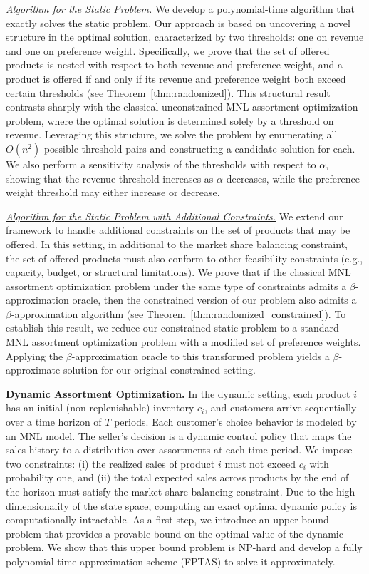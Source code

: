 \documentclass[mnsc,non-blindrev]{informs3}
\theoremstyle{definition}
\begin{document}
\noindent\underline{\it Algorithm for the Static Problem.} We develop a polynomial-time algorithm that exactly solves the static problem. Our approach is based on uncovering a novel structure in the optimal solution, characterized by two thresholds: one on revenue and one on preference weight. Specifically, we prove that the set of offered products is nested with respect to both revenue and preference weight, and a product is offered if and only if its revenue and preference weight both exceed certain thresholds (see Theorem~\ref{thm:randomized}). This structural result contrasts sharply with the classical unconstrained MNL assortment optimization problem, where the optimal solution is determined solely by a threshold on revenue.
Leveraging this structure, we solve the problem by enumerating all $O(n^2)$ possible threshold pairs and constructing a candidate solution for each. We also perform a sensitivity analysis of the thresholds with respect to $\alpha$, showing that the revenue threshold increases as $\alpha$ decreases, while the preference weight threshold may either increase or decrease.


\noindent\underline{\it Algorithm for the Static Problem with Additional Constraints.} We extend our framework to handle additional constraints on the set of products that may be offered. In this setting, in additional to the market share balancing constraint, the set of offered products must also conform to other feasibility constraints (e.g., capacity, budget, or structural limitations). We prove that if the classical MNL assortment optimization problem under the same type of constraints admits a $\beta$-approximation oracle, then the constrained version of our problem also admits a $\beta$-approximation algorithm (see Theorem~\ref{thm:randomized_constrained}).
To establish this result, we reduce our constrained static problem to a standard MNL assortment optimization problem with a modified set of preference weights. Applying the $\beta$-approximation oracle to this transformed problem yields a $\beta$-approximate solution for our original constrained setting.

\vspace{2mm}
\noindent\textbf{Dynamic Assortment Optimization.} In the dynamic setting, each product $i$ has an initial (non-replenishable) inventory $c_i$, and customers arrive sequentially over a time horizon of $T$ periods. Each customer's choice behavior is modeled by an MNL model. The seller's decision is a dynamic control policy that maps the sales history to a distribution over assortments at each time period. We impose two constraints: (i) the realized sales of product $i$ must not exceed $c_i$ with probability one, and (ii) the total expected sales across products by the end of the horizon must satisfy the market share balancing constraint.
Due to the high dimensionality of the state space, computing an exact optimal dynamic policy is computationally intractable. As a first step, we introduce an upper bound problem that provides a provable bound on the optimal value of the dynamic problem. We show that this upper bound problem is NP-hard and develop a fully polynomial-time approximation scheme (FPTAS) to solve it approximately.
\end{document}
